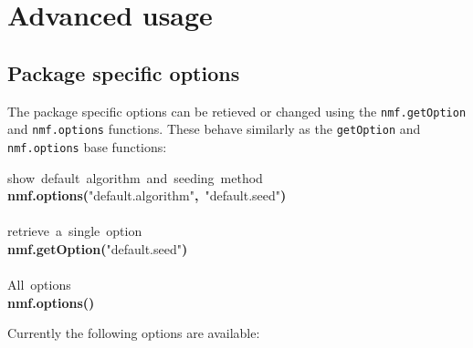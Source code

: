 \documentclass[a4paper]{article}\usepackage{graphicx, color}
\makeatletter
\newcommand{\hlfunctioncall}[1]{\textcolor[rgb]{0.501960784313725,0,0.329411764705882}{\textbf{#1}}}%
\newcommand{\hlstring}[1]{\textcolor[rgb]{0.6,0.6,1}{#1}}%
\newcommand{\hlkeyword}[1]{\textcolor[rgb]{0,0,0}{\textbf{#1}}}%
\newcommand{\hlcomment}[1]{\textcolor[rgb]{0.180392156862745,0.6,0.341176470588235}{#1}}%
\newcommand{\hlstd}[1]{\textcolor[rgb]{0,0,0}{#1}}%
\newenvironment{kframe}{%
 \def\FrameCommand##1{\hskip\@totalleftmargin \hskip-\fboxsep
 \colorbox{shadecolor}{##1}\hskip-\fboxsep
     \hskip-\linewidth \hskip-\@totalleftmargin \hskip\columnwidth}%
 \MakeFramed {\advance\hsize-\width
   \@totalleftmargin\z@ \linewidth\hsize
   \@setminipage}}%
 {\par\unskip\endMakeFramed}
\newenvironment{knitrout}{}{} %
\let\code=\texttt
\makeatother
\begin{document}
\section{Advanced usage}

\subsection{Package specific options}
The package specific options can be retieved or changed using the \code{nmf.getOption} and \code{nmf.options} functions. 
These behave similarly as the \code{getOption} and \code{nmf.options} base functions:

\begin{knitrout}
\color{fgcolor}\begin{kframe}
\begin{flushleft}
\ttfamily\noindent
\hlcomment{\usebox{\hlnormalsizeboxhash}{\ }show{\ }default{\ }algorithm{\ }and{\ }seeding{\ }method}\hspace*{\fill}\\
\hlstd{}\hlfunctioncall{nmf.options}\hlkeyword{(}\hlstring{"{}default.algorithm"{}}\hlkeyword{,}{\ }\hlstring{"{}default.seed"{}}\hlkeyword{)}\hspace*{\fill}\\
\hlstd{}\hspace*{\fill}\\
\hlstd{}\hlcomment{\usebox{\hlnormalsizeboxhash}{\ }retrieve{\ }a{\ }single{\ }option}\hspace*{\fill}\\
\hlstd{}\hlfunctioncall{nmf.getOption}\hlkeyword{(}\hlstring{"{}default.seed"{}}\hlkeyword{)}\hspace*{\fill}\\
\hlstd{}\hspace*{\fill}\\
\hlstd{}\hlcomment{\usebox{\hlnormalsizeboxhash}{\ }All{\ }options}\hspace*{\fill}\\
\hlstd{}\hlfunctioncall{nmf.options}\hlkeyword{(}\hlkeyword{)}\mbox{}
\normalfont
\end{flushleft}
\end{kframe}
\end{knitrout}


Currently the following options are available:
\end{document}
